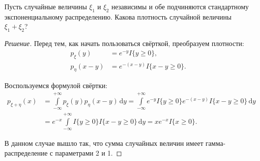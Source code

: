 \begin{problem}
	Пусть случайные величины \(\xi_1\) и \(\xi_2\) независимы и обе подчиняются стандартному экспоненциальному распределению. Какова плотность случайной величины \(\xi_1 + \xi_2\)?
\end{problem}
\begin{proof}[Решение]
	Перед тем, как начать пользоваться свёрткой, преобразуем плотности:
	\begin{align}
		p_{\xi}(y) &= e^{-y}I\{y \geq 0\}, \\
		p_{\eta}(x - y) &= e^{-(x - y)}I\{x - y \geq 0\}.
	\end{align}
	
	Воспользуемся формулой свёртки:
	\begin{align}
		p_{\xi + \eta}(x) &= \int\limits_{-\infty}^{+\infty} p_{\xi}(y) p_{\eta}(x - y)\,\mathrm{d}y = \int\limits_{-\infty}^{+\infty} e^{-y}I\{y \geq 0\}e^{-(x - y)}I\{x - y \geq 0\}\,\mathrm{d}y \\
		&= e^{-x}\int\limits_{-\infty}^{+\infty} I\{y \geq 0\}I\{x - y \geq 0\}\,\mathrm{d}y = xe^{-x}I\{x \geq 0\}.
	\end{align}
	
	В данном случае вышло так, что сумма случайных величин имеет гамма-распределение с параметрами 2 и 1.
\end{proof}

